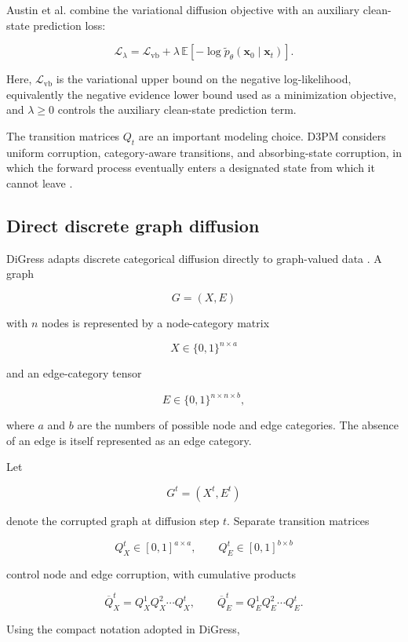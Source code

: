 Austin et al. combine the variational diffusion objective with an auxiliary clean-state prediction loss:

\[
\mathcal{L}_{\lambda}
=
\mathcal{L}_{\mathrm{vb}}
+
\lambda
\,
\mathbb{E}
\left[
-\log
\widetilde{p}_\theta
\left(
\mathbf{x}_0
\mid
\mathbf{x}_t
\right)
\right].
\]

Here, \(\mathcal{L}_{\mathrm{vb}}\) is the variational upper bound on the negative log-likelihood, equivalently the negative evidence lower bound used as a minimization objective, and \(\lambda\geq0\) controls the auxiliary clean-state prediction term.

The transition matrices \(Q_t\) are an important modeling choice. D3PM considers uniform corruption, category-aware transitions, and absorbing-state corruption, in which the forward process eventually enters a designated state from which it cannot leave \cite{austin2021structured}.


\subsection{Direct discrete graph diffusion}
\label{subsec:rw_direct_graph_diffusion}

DiGress adapts discrete categorical diffusion directly to graph-valued data \cite{vignac2023digress}. A graph

\[
G=(X,E)
\]

with \(n\) nodes is represented by a node-category matrix

\[
X\in\{0,1\}^{n\times a}
\]

and an edge-category tensor

\[
E\in\{0,1\}^{n\times n\times b},
\]

where \(a\) and \(b\) are the numbers of possible node and edge categories. The absence of an edge is itself represented as an edge category.

Let

\[
G^t=(X^t,E^t)
\]

denote the corrupted graph at diffusion step \(t\). Separate transition matrices

\[
Q_X^t\in[0,1]^{a\times a},
\qquad
Q_E^t\in[0,1]^{b\times b}
\]

control node and edge corruption, with cumulative products

\[
\overline{Q}_X^t
=
Q_X^1Q_X^2\cdots Q_X^t,
\qquad
\overline{Q}_E^t
=
Q_E^1Q_E^2\cdots Q_E^t.
\]

Using the compact notation adopted in DiGress,

